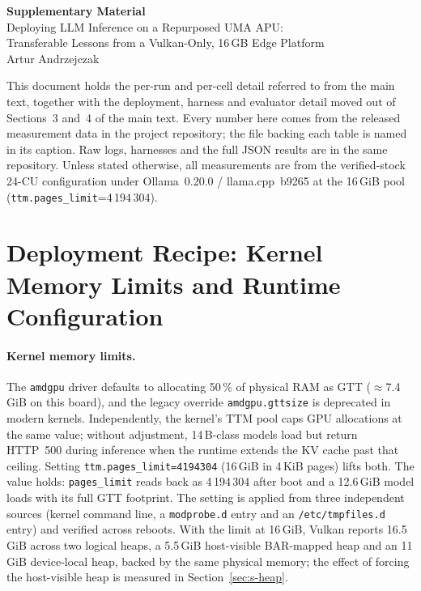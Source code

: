 \documentclass[11pt,a4paper]{article}
\begin{document}
\begin{center}
{\Large\bfseries Supplementary Material}\\[0.6ex]
{\large Deploying LLM Inference on a Repurposed UMA APU:\\
Transferable Lessons from a Vulkan-Only, 16\,GB Edge Platform}\\[1.2ex]
{Artur Andrzejczak}\\[0.8ex]
\end{center}

\noindent This document holds the per-run and per-cell detail referred to from the
main text, together with the deployment, harness and evaluator detail
moved out of Sections~3 and~4 of the main text.  Every number here comes from the released measurement data
in the project repository; the file backing each table is named in its
caption.  Raw logs, harnesses and the full JSON results are in the same
repository.  Unless stated otherwise, all measurements are from the
verified-stock 24-CU configuration under Ollama~0.20.0 /
llama.cpp~b9265 at the 16\,GiB pool
(\texttt{ttm.pages\_limit}=4\,194\,304).

\tableofcontents

\section{Deployment Recipe: Kernel Memory Limits and Runtime Configuration}

\paragraph{Kernel memory limits.}  The \texttt{amdgpu} driver defaults
to allocating 50\,\% of physical RAM as GTT ($\approx$7.4\,GiB on this
board), and the legacy override \texttt{amdgpu.gttsize} is deprecated
in modern kernels.  Independently, the kernel's TTM pool caps GPU
allocations at the same value; without adjustment, 14\,B-class models
load but return HTTP~500 during inference when the runtime extends the
KV cache past that ceiling.  Setting \texttt{ttm.pages\_limit=4194304}
(16\,GiB in 4\,KiB pages) lifts both.  The value holds:
\texttt{pages\_limit} reads back as 4\,194\,304 after boot and a
12.6\,GiB model loads with its full GTT footprint.  The setting is
applied from three independent sources (kernel command line, a
\texttt{modprobe.d} entry and an \texttt{/etc/tmpfiles.d} entry) and
verified across reboots.  With the limit at 16\,GiB, Vulkan reports
16.5\,GiB across two logical heaps, a 5.5\,GiB host-visible
BAR-mapped heap and an 11\,GiB device-local heap, backed by the same
physical memory; the effect of forcing the host-visible heap is
measured in Section~\ref{sec:s-heap}.
\end{document}
